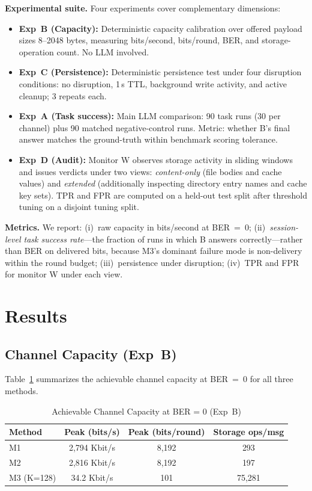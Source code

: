 \documentclass[conference]{IEEEtran}
\begin{document}
\textbf{Experimental suite.} Four experiments cover complementary dimensions:
\begin{itemize}
    \item \textbf{Exp~B (Capacity):} Deterministic capacity calibration over offered payload sizes 8--2048 bytes, measuring bits/second, bits/round, BER, and storage-operation count. No LLM involved.
    \item \textbf{Exp~C (Persistence):} Deterministic persistence test under four disruption conditions: no disruption, 1\,s TTL, background write activity, and active cleanup; 3 repeats each.
    \item \textbf{Exp~A (Task success):} Main LLM comparison: 90 task runs (30 per channel) plus 90 matched negative-control runs. Metric: whether B's final answer matches the ground-truth within benchmark scoring tolerance.
    \item \textbf{Exp~D (Audit):} Monitor W observes storage activity in sliding windows and issues verdicts under two views: \textit{content-only} (file bodies and cache values) and \textit{extended} (additionally inspecting directory entry names and cache key sets). TPR and FPR are computed on a held-out test split after threshold tuning on a disjoint tuning split.
\end{itemize}

\textbf{Metrics.} We report: (i)~raw capacity in bits/second at BER~=~0; (ii)~\textit{session-level task success rate}---the fraction of runs in which B answers correctly---rather than BER on delivered bits, because M3's dominant failure mode is non-delivery within the round budget; (iii)~persistence under disruption; (iv)~TPR and FPR for monitor W under each view.

\section{Results}

\subsection{Channel Capacity (Exp~B)}

Table~\ref{tab:capacity} summarizes the achievable channel capacity at BER~=~0 for all three methods.

\begin{table}[htbp]
\caption{Achievable Channel Capacity at BER = 0 (Exp~B)}
\begin{center}
\begin{tabular}{lccc}
\toprule
\textbf{Method} & \textbf{Peak (bits/s)} & \textbf{Peak (bits/round)} & \textbf{Storage ops/msg} \\
\midrule
M1 & 2{,}794 Kbit/s & 8{,}192 & 293 \\
M2 & 2{,}816 Kbit/s & 8{,}192 & 197 \\
M3 (K=128) & 34.2 Kbit/s & 101 & 75{,}281 \\
\bottomrule
\end{tabular}
\label{tab:capacity}
\end{center}
\end{table}
\end{document}
